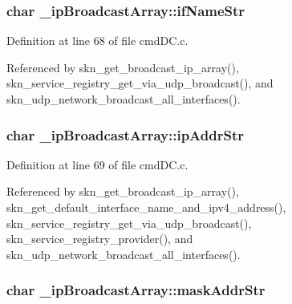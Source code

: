 \hypertarget{struct__ip_broadcast_array_a193b90f271c061e8bf1593bab6a182c9}{
\subsubsection[{if\+Name\+Str}]{\setlength{\rightskip}{0pt plus 5cm}char \+\_\+ip\+Broadcast\+Array\+::if\+Name\+Str}}\label{struct__ip_broadcast_array_a193b90f271c061e8bf1593bab6a182c9}


Definition at line 68 of file cmd\+D\+C.\+c.



Referenced by skn\+\_\+get\+\_\+broadcast\+\_\+ip\+\_\+array(), skn\+\_\+service\+\_\+registry\+\_\+get\+\_\+via\+\_\+udp\+\_\+broadcast(), and skn\+\_\+udp\+\_\+network\+\_\+broadcast\+\_\+all\+\_\+interfaces().

\hypertarget{struct__ip_broadcast_array_a96891ccc707337890b2a166e3ef3a8e1}{
\subsubsection[{ip\+Addr\+Str}]{\setlength{\rightskip}{0pt plus 5cm}char \+\_\+ip\+Broadcast\+Array\+::ip\+Addr\+Str}}\label{struct__ip_broadcast_array_a96891ccc707337890b2a166e3ef3a8e1}


Definition at line 69 of file cmd\+D\+C.\+c.



Referenced by skn\+\_\+get\+\_\+broadcast\+\_\+ip\+\_\+array(), skn\+\_\+get\+\_\+default\+\_\+interface\+\_\+name\+\_\+and\+\_\+ipv4\+\_\+address(), skn\+\_\+service\+\_\+registry\+\_\+get\+\_\+via\+\_\+udp\+\_\+broadcast(), skn\+\_\+service\+\_\+registry\+\_\+provider(), and skn\+\_\+udp\+\_\+network\+\_\+broadcast\+\_\+all\+\_\+interfaces().

\hypertarget{struct__ip_broadcast_array_a9241c1fbfb22a3ecfe4777863a063eb3}{
\subsubsection[{mask\+Addr\+Str}]{\setlength{\rightskip}{0pt plus 5cm}char \+\_\+ip\+Broadcast\+Array\+::mask\+Addr\+Str}}\label{struct__ip_broadcast_array_a9241c1fbfb22a3ecfe4777863a063eb3}


